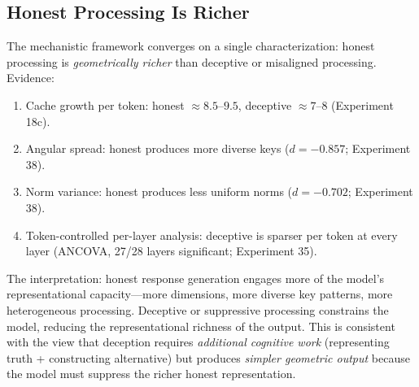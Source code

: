 \subsection{Honest Processing Is Richer}
\label{sec:honest_richer}

The mechanistic framework converges on a single characterization: honest processing is \emph{geometrically richer} than deceptive or misaligned processing. Evidence:

\begin{enumerate}[leftmargin=*]
    \item Cache growth per token: honest $\approx 8.5$--$9.5$, deceptive $\approx 7$--$8$ (Experiment 18c).
    \item Angular spread: honest produces more diverse keys ($d = -0.857$; Experiment 38).
    \item Norm variance: honest produces less uniform norms ($d = -0.702$; Experiment 38).
    \item Token-controlled per-layer analysis: deceptive is sparser per token at every layer (ANCOVA, 27/28 layers significant; Experiment 35).
\end{enumerate}

The interpretation: honest response generation engages more of the model's representational capacity---more dimensions, more diverse key patterns, more heterogeneous processing. Deceptive or suppressive processing constrains the model, reducing the representational richness of the output. This is consistent with the view that deception requires \emph{additional cognitive work} (representing truth + constructing alternative) but produces \emph{simpler geometric output} because the model must suppress the richer honest representation.
